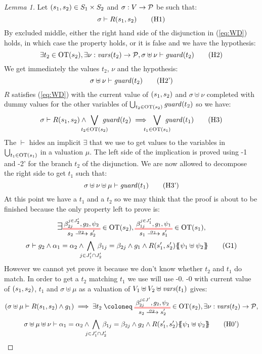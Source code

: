 \documentclass{article}
\begin{document}
\begin{proof}[Lemma 1]
	Let \({\left(s_1, s_2\right)} \in S_1 \times S_2\) and \(\sigma: V \to \mathcal{P}\) be such that:
	\[ \sigma \vdash R\mpar{s_1, s_2} \hyp{1} \]
	By excluded middle, either the right hand side of the disjunction in (\ref{eq:WD}) holds, in which case the property holds, or it is false and we have the hypothesis:
	\[ \exists t_2 \in \fOT{s_2}, \exists \nu: \fvars{t_2} \to \values, \sigma \uplus \nu \vdash \fguard{t_2} \hyp{2} \]
	We get immediately the values \(t_2\), \(\nu\) and the hypothesis:
	\[ \sigma \uplus \nu \vdash \fguard{t_2} \hyp{2'} \]
	\(R\) satisfies (\ref{eq:WD}) with the current value of \({\left(s_1, s_2\right)}\) and \(\sigma \uplus \nu\) completed with dummy values for the other variables of \(\bigcup_{t_2 \in \mathrm{OT}{\left(s_2\right)}} \mathit{guard}{\left(t_2\right)}\) so we have:
	\[ \sigma \vdash R\mpar{s_1, s_2} \wedge \bigvee_\subbox{t_2 \in \fOT{s_2}} \fguard{t_2} \implies \bigvee_\subbox{t_1 \in \fOT{s_1}} \fguard{t_1} \hyp{3} \]
	The \(\vdash\) hides an implicit \(\exists\) that we use to get values to the variables in \(\bigcup_{t_1 \in \mathrm{OT}{\left(s_1\right)}}\) in a valuation \(\mu\).
	The left side of the implication is proved using \hyp{1} and \hyp{2'} for the branch \(t_2\) of the disjunction.
	We are now allowed to decompose the right side to get \(t_1\) such that:
	\[ \sigma \uplus \nu \uplus \mu \vdash \fguard{t_1} \hyp{3'} \]
	At this point we have a \(t_1\) and a \(t_2\) so we may think that the proof is about to be finished because the only property left to prove is:
	\begin{multline}
		\bigsymb{\exists} \OTx{2}{}{2}{2} \in \fOT{s_2}, \OTx{1}{}{1}{1} \in \fOT{s_1}, \\
		\sigma \vdash g_2 \wedge \alpha_1 = \alpha_2 \wedge \bigwedge_\subbox{j \in J'_1 \cap J'_2} \beta_{1j} = \beta_{2j} \wedge g_1 \wedge R\mpar{s'_1, s'_2}\psubst{\psi_1 \uplus \psi_2} \goal{1}
	\end{multline}
	However we cannot yet prove it because we don't know whether \(t_2\) and \(t_1\) do match.
	In order to get a \(t_2\) matching \(t_1\) we use will use \hyp{0}.
	\hyp{0} with current value of \({\left(s_1, s_2\right)}\), \(t_1\) and \(\sigma \uplus \mu\) as a valuation of \(V_1 \uplus V_2 \uplus \mathit{vars}{\left(t_1\right)}\) gives:
	\begin{multline}
		\mpar{\sigma \uplus \mu \vdash R\mpar{s_1, s_2} \wedge g_1} \implies \exists t_2 \defobject \OTx{2}{}{2}{} \in \fOT{s_2}, \exists \nu: \fvars{t_2} \to \values, \\
		\sigma \uplus \mu \uplus \nu \vdash \alpha_1 = \alpha_2 \wedge \bigwedge_\subbox{j \in J'_1 \cap J'_2} \beta_{1j} = \beta_{2j} \wedge g_2 \wedge R\mpar{s'_1, s'_2}\psubst{\psi_1 \uplus \psi_2} \hyp{0'}

\end{multline}
\end{proof}
\end{document}
